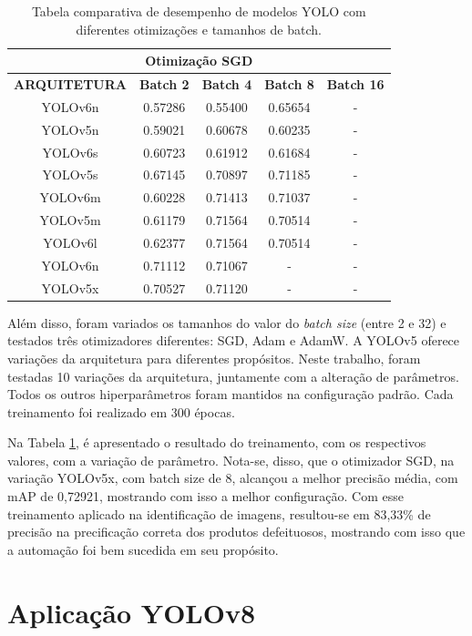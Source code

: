 \begin{table}[h!]
\begin{tabular}{|c|c|c|c|c|}
    \multicolumn{5}{|c|}{\textbf{Otimização SGD}} \\ \hline
    \textbf{ARQUITETURA} & \textbf{Batch 2} & \textbf{Batch 4} & \textbf{Batch 8} & \textbf{Batch 16} \\ \hline
    YOLOv6n  & 0.57286 & 0.55400 & 0.65654 & - \\ \hline
    YOLOv5n  & 0.59021 & 0.60678 & 0.60235 & - \\ \hline
    YOLOv6s  & 0.60723 & 0.61912 & 0.61684 & - \\ \hline
    YOLOv5s  & 0.67145 & 0.70897 & 0.71185 & - \\ \hline
    YOLOv6m  & 0.60228 & 0.71413 & 0.71037 & - \\ \hline
    YOLOv5m  & 0.61179 & 0.71564 & 0.70514 & - \\ \hline
    YOLOv6l  & 0.62377 & 0.71564 & 0.70514 & - \\ \hline
    YOLOv6n  & 0.71112 & 0.71067 & - & - \\ \hline
    YOLOv5x  & 0.70527 & 0.71120 & - & - \\ \hline
    \end{tabular}
    \caption{Tabela comparativa de desempenho de modelos YOLO com diferentes otimizações e tamanhos de batch.}
    \label{tab:resultado-mancha}
    \end{table}

Além disso, foram variados os tamanhos do valor do \textit{batch size} (entre 2 e 32) e testados três otimizadores diferentes: SGD, Adam e AdamW. A YOLOv5 oferece variações da arquitetura para diferentes propósitos. Neste trabalho, foram testadas 10 variações da arquitetura, juntamente com a alteração de parâmetros. Todos os outros hiperparâmetros foram mantidos na configuração padrão. Cada treinamento foi realizado em 300 épocas.

Na Tabela \ref{tab:resultado-mancha}, é apresentado o resultado do treinamento, com os respectivos valores, com a variação de parâmetro. Nota-se, disso, que o otimizador SGD, na variação YOLOv5x, com batch size de 8, alcançou a melhor precisão média, com mAP de 0,72921, mostrando com isso a melhor configuração. Com esse treinamento aplicado na identificação de imagens, resultou-se em 83,33\% de precisão na precificação correta dos produtos defeituosos, mostrando com isso que a automação foi bem sucedida em seu propósito.

   

\section{Aplicação YOLOv8}
